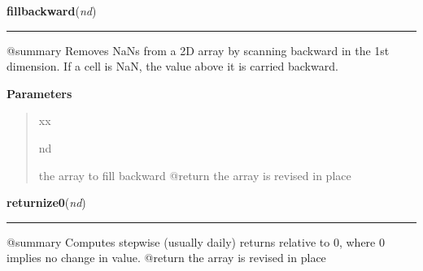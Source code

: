     \label{trunk:qstkutil:tsutil:fillbackward}

    \vspace{0.5ex}

\hspace{.8\funcindent}\begin{boxedminipage}{\funcwidth}

    \raggedright \textbf{fillbackward}(\textit{nd})

    \vspace{-1.5ex}

    \rule{\textwidth}{0.5\fboxrule}
\setlength{\parskip}{2ex}
    @summary Removes NaNs from a 2D array by scanning backward in the 1st 
    dimension.  If a cell is NaN, the value above it is carried backward.

\setlength{\parskip}{1ex}
      \textbf{Parameters}
      \vspace{-1ex}

      \begin{quote}
        \begin{Ventry}{xx}

          \item[nd]

          the array to fill backward @return the array is revised in place

        \end{Ventry}

      \end{quote}

    \end{boxedminipage}

    \label{trunk:qstkutil:tsutil:returnize0}

    \vspace{0.5ex}

\hspace{.8\funcindent}\begin{boxedminipage}{\funcwidth}

    \raggedright \textbf{returnize0}(\textit{nd})

    \vspace{-1.5ex}

    \rule{\textwidth}{0.5\fboxrule}
\setlength{\parskip}{2ex}
    @summary Computes stepwise (usually daily) returns relative to 0, where
    0 implies no change in value. @return the array is revised in place

\setlength{\parskip}{1ex}
    \end{boxedminipage}

